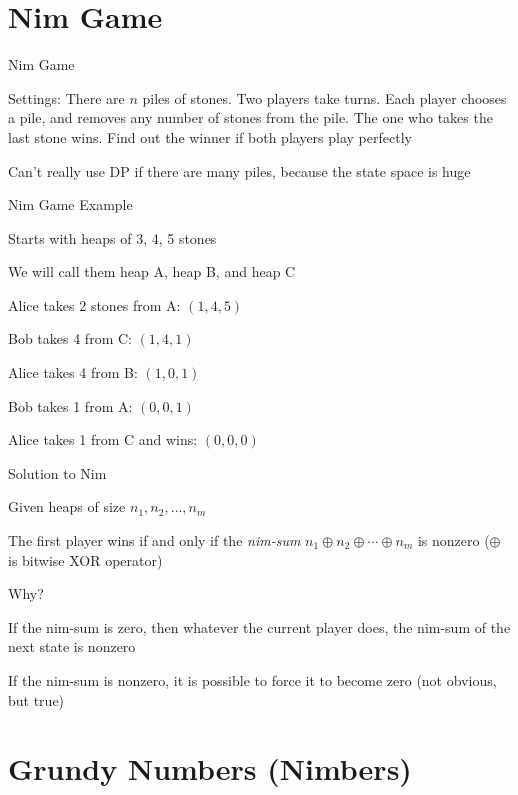 \documentclass[13pt,onlymath]{beamer}
\begin{document}
\section{Nim Game}

\begin{frame}{Nim Game}
\BIT
\item Settings: There are $n$ piles of stones. Two players take turns. Each player chooses a pile, and removes any number of stones from the pile. The one who takes the last stone wins. Find out the winner if both players play perfectly
\vfill
\item Can't really use DP if there are many piles, because the state space is huge
\EIT
\end{frame}

\begin{frame}{Nim Game Example}
\BIT
\item Starts with heaps of 3, 4, 5 stones
\BIT
\item We will call them heap A, heap B, and heap C
\EIT
\vfill
\item Alice takes 2 stones from A: $(1, 4, 5)$
\item Bob takes 4 from C: $(1, 4, 1)$
\item Alice takes 4 from B: $(1, 0, 1)$
\item Bob takes 1 from A: $(0, 0, 1)$
\item Alice takes 1 from C and wins: $(0, 0, 0)$
\EIT
\end{frame}

\begin{frame}{Solution to Nim}
\BIT
\item Given heaps of size $n_1, n_2, \ldots, n_m$
\item The first player wins if and only if the \emph{nim-sum} $n_1 \oplus n_2 \oplus \cdots \oplus n_m$ is nonzero ($\oplus$ is bitwise XOR operator)
\vfill
\item Why?
\BIT
\item If the nim-sum is zero, then whatever the current player does, the nim-sum of the next state is nonzero
\item If the nim-sum is nonzero, it is possible to force it to become zero (not obvious, but true)
\EIT
\EIT
\end{frame}


\section{Grundy Numbers (Nimbers)}
\end{document}
